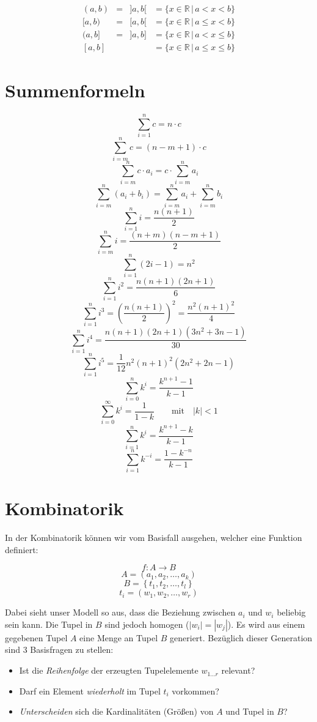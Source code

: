 \documentclass[a4paper,twocolumn]{article}
\newcommand{\set}[1]{\left\{#1\right\}}
\newcommand{\tuple}[1]{\left(#1\right)}
\begin{document}
\begin{align}
    (a,b) & = & ]a,b[ & = \{x\in\mathbb{R}\,|\,a<x<b\} \\
    [a,b) & = & [a,b[ & = \{x\in\mathbb{R}\,|\,a\le x<b\} \\
    (a,b] & = & ]a,b] & = \{x\in\mathbb{R}\,|\,a<x\le b\} \\
    [a,b] &   &       & = \{x\in\mathbb{R}\,|\,a\le x\le b\}
\end{align}

\section{Summenformeln}

\[
    \sum_{i=1}^{n}c = n \cdot c
\] \[
    \sum_{i=m}^{n}c = (n-m+1) \cdot c
\] \[
    \sum_{i=m}^{n}c \cdot a_i = c \cdot \sum_{i=m}^{n}a_i
\] \[
    \sum_{i=m}^{n}(a_i + b_i) = \sum_{i=m}^{n}a_i + \sum_{i=m}^{n}b_i
\] \[
    \sum_{i=1}^n i = \frac{n(n+1)}{2}
\] \[
    \sum_{i=m}^n i = \frac{(n+m)(n-m+1)}{2}
\] \[
    \sum_{i=1}^n (2i-1) = n^2
\] \[
    \sum_{i=1}^n i^2 = \frac{n(n+1)(2n+1)}{6}
\] \[
    \sum_{i=1}^n i^3 = \left(\frac{n(n+1)}{2}\right)^2 = \frac{n^2(n+1)^2}{4}
\] \[
    \sum_{i=1}^n i^4 = \frac{n(n+1)(2n+1)(3n^2+3n-1)}{30}
\] \[
    \sum_{i=1}^n i^5 = \frac {1}{12} n^2 \left(n + 1\right)^2 \left(2n^2 + 2n -1\right)
\] \[
    \sum_{i=0}^n k^i = \frac{k^{n+1} -1}{k-1}
\] \[
    \sum_{i=0}^{\infty} k^i = \frac{1}{1-k} \qquad \text{mit} \quad |k|<1
\] \[
    \sum_{i=1}^n k^i = \frac{k^{n+1} -k}{k-1}
\] \[
    \sum_{i=1}^n k^{-i} = \frac{1-k^{-n}}{k-1}
\]

\newpage
\section{Kombinatorik}

In der Kombinatorik können wir vom Basisfall ausgehen, welcher eine
Funktion definiert:

\[
    f: A \rightarrow B
\] \[
    A = \tuple{a_1, a_2, \ldots, a_k}
\] \[
    B = \set{t_1, t_2, \ldots, t_l}
\] \[
    t_i = \tuple{w_1, w_2, \ldots, w_r}
\]

Dabei sieht unser Modell so aus, dass die Beziehung zwischen $a_i$ und
$w_i$ beliebig sein kann. Die Tupel in $B$ sind jedoch homogen
($|w_i| = |w_j|$). Es wird aus einem gegebenen Tupel $A$ eine
Menge an Tupel $B$ generiert. Bezüglich dieser Generation sind 3
Basisfragen zu stellen:

\begin{itemize}
  \item Ist die \emph{Reihenfolge} der erzeugten Tupelelemente
        $w_{1\ldots r}$ relevant?
  \item Darf ein Element \emph{wiederholt} im Tupel $t_i$ vorkommen?
  \item \emph{Unterscheiden} sich die Kardinalitäten (Größen) von
        $A$ und Tupel in $B$?
\end{itemize}
\end{document}
